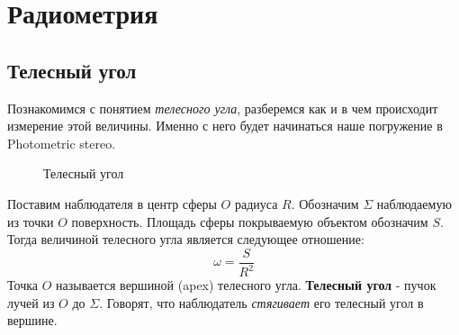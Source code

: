 \documentclass[12pt]{article}
\begin{document}


\newpage
\tableofcontents

\newpage



\newpage

\section{Радиометрия}
\subsection{Телесный угол}

Познакомимся с понятием \textit{телесного угла}, разберемся как и в чем происходит измерение этой величины. Именно с него будет начинаться наше погружение
в Photometric stereo.

\begin{figure}
  \begin{center}
    \caption{Телесный угол}
  \end{center}
\end{figure}

Поставим наблюдателя в центр сферы $O$ радиуса $R$. Обозначим $\Sigma$ наблюдаемую
из точки $O$ поверхность. Площадь сферы покрываемую объектом обозначим $S$. Тогда величиной телесного угла
является следующее отношение:
$$\omega=\frac{S}{R^2}$$
Точка $O$ называется вершиной (apex) телесного угла.
\textbf{Телесный угол} - пучок лучей из $O$ до $\Sigma$.
Говорят, что наблюдатель \textit{стягивает} его телесный угол в вершине.
\end{document}
